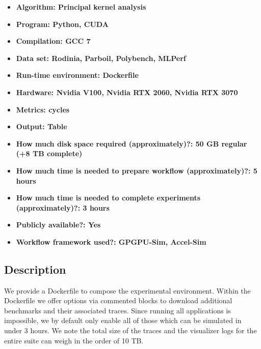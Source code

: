 \documentclass{sigplanconf}
\begin{document}
{\small
\begin{itemize}
  \item {\bf Algorithm: Principal kernel analysis}
  \item {\bf Program: Python, CUDA}
  \item {\bf Compilation: GCC 7}
  \item {\bf Data set: Rodinia, Parboil, Polybench, MLPerf }
  \item {\bf Run-time environment: Dockerfile }
  \item {\bf Hardware: Nvidia V100, Nvidia RTX 2060, Nvidia RTX 3070}
  \item {\bf Metrics: cycles}
  \item {\bf Output: Table }
  \item {\bf How much disk space required (approximately)?: 50 GB regular (+8 TB complete)}
  \item {\bf How much time is needed to prepare workflow (approximately)?: 5 hours }
  \item {\bf How much time is needed to complete experiments (approximately)?: 3 hours }
  \item {\bf Publicly available?: Yes}
  \item {\bf Workflow framework used?: GPGPU-Sim, Accel-Sim}
\end{itemize}

\subsection{Description}
We provide a Dockerfile to compose the experimental environment. Within the Dockerfile we offer options
via commented blocks to download additional benchmarks and their associated traces. Since running all applications 
is impossible, we by default only enable all of those which can be simulated in under 3 hours. We note the total size 
of the traces and the visualizer logs for the entire suite can weigh in the order of 10 TB.

}
\end{document}
